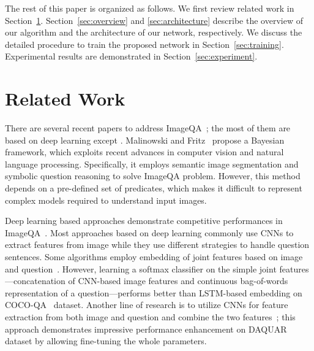 \documentclass[10pt,twocolumn,letterpaper]{article}
\begin{document}
The rest of this paper is organized as follows. 
We first review related work in Section~\ref{sec:related}. 
Section~\ref{sec:overview} and \ref{sec:architecture} describe the overview of our algorithm and the architecture of our network, respectively.
We discuss the detailed procedure to train the proposed network in Section~\ref{sec:training}.
Experimental results are demonstrated in Section~\ref{sec:experiment}.

\section{Related Work}
\label{sec:related}





There are several recent papers to address ImageQA~\cite{VQA, Baiduqa, Convqa, Multiworld, Askneurons, mren2015}; the most of them are based on deep learning except \cite{Multiworld}.
Malinowski and Fritz~\cite{Multiworld} propose a Bayesian framework, which exploits recent advances in computer vision and natural language processing. 
Specifically, it employs semantic image segmentation and symbolic question reasoning to solve ImageQA problem.
However, this method depends on a pre-defined set of predicates, which makes it difficult to represent complex models required to understand input images.




Deep learning based approaches demonstrate competitive performances in ImageQA~\cite{Askneurons, Baiduqa, mren2015, Convqa, VQA}.
Most approaches based on deep learning commonly use CNNs to extract features from image while they use different strategies to handle question sentences.
Some algorithms employ embedding of joint features based on image and question~\cite{VQA, Baiduqa, Askneurons}.
However, learning a softmax classifier on the simple joint features---concatenation of CNN-based image features and continuous bag-of-words representation of a question---performs better than LSTM-based embedding on COCO-QA~\cite{mren2015} dataset.
Another line of research is to utilize CNNs for feature extraction from both image and question and  combine the two features~\cite{Convqa}; this approach demonstrates impressive performance enhancement on DAQUAR~\cite{Multiworld} dataset by allowing fine-tuning the whole parameters.
\end{document}
